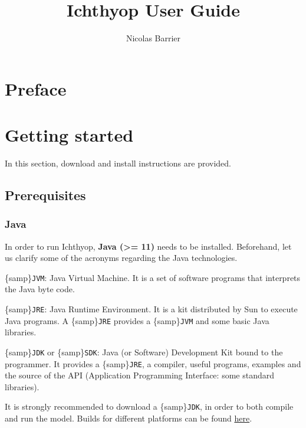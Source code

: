 \documentclass[
  letterpaper,
  DIV=11,
  numbers=noendperiod]{scrreprt}
\title{Ichthyop User Guide}
\author{Nicolas Barrier}
\date{}
\renewcommand*\contentsname{Table of contents}
\newcommand\contentsname{Table of contents}
\begin{document}
\maketitle

\renewcommand*\contentsname{Table of contents}
{
\hypersetup{linkcolor=}
\setcounter{tocdepth}{2}
\tableofcontents
}

\chapter*{Preface}\label{preface}



\chapter{Getting started}\label{getting-started}

In this section, download and install instructions are provided.

\section{Prerequisites}\label{prerequisites}

\subsection{Java}\label{java}

In order to run Ichthyop, \textbf{Java (\textgreater= 11)} needs to be
installed. Beforehand, let us clarify some of the acronyms regarding the
Java technologies.

\{samp\}\texttt{JVM}: Java Virtual Machine. It is a set of software
programs that interprets the Java byte code.

\{samp\}\texttt{JRE}: Java Runtime Environment. It is a kit distributed
by Sun to execute Java programs. A \{samp\}\texttt{JRE} provides a
\{samp\}\texttt{JVM} and some basic Java libraries.

\{samp\}\texttt{JDK} or \{samp\}\texttt{SDK}: Java (or Software)
Development Kit bound to the programmer. It provides a
\{samp\}\texttt{JRE}, a compiler, useful programs, examples and the
source of the API (Application Programming Interface: some standard
libraries).

It is strongly recommended to download a \{samp\}\texttt{JDK}, in order
to both compile and run the model. Builds for different platforms can be
found \href{https://www.oracle.com/java/technologies/downloads/}{here}.
\end{document}
